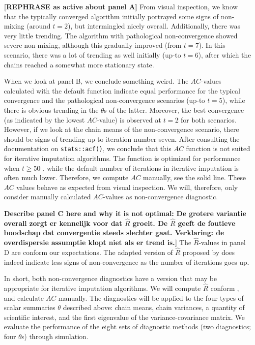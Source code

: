 \documentclass[Royal,times,sageh]{sagej}
\begin{document}
\textbf{{[}REPHRASE as active about panel A{]}} From visual inspection, we know that the typically converged algorithm initially portrayed some signs of non-mixing (around \(t=2\)), but intermingled nicely overall. Additionally, there was very little trending. The algorithm with pathological non-convergence showed severe non-mixing, although this gradually improved (from \(t=7\)). In this scenario, there was a lot of trending as well initially (up-to \(t=6\)), after which the chains reached a somewhat more stationary state.

When we look at panel B, we conclude something weird. The \(AC\)-values calculated with the default function indicate equal performance for the typical convergence and the pathological non-convergence scenarios (up-to \(t=5\)), while there is obvious trending in the \(\theta\)s of the latter. Moreover, the best convergence (as indicated by the lowest \(AC\)-value) is observed at \(t=2\) for both scenarios. However, if we look at the chain means of the non-convergence scenario, there should be signs of trending up-to iteration number seven. After consulting the documentation on \texttt{stats::acf()}, we conclude that this \(AC\) function is not suited for iterative imputation algorithms. The function is optimized for performance when \(t\geq50\) \citep{box15}, while the default number of iterations in iterative imputation is often much lower. Therefore, we compute \(AC\) manually, see the solid line. These \(AC\) values behave as expected from visual inspection. We will, therefore, only consider manually calculated \(AC\)-values as non-convergence diagnostic.

\textbf{Describe panel C here and why it is not optimal: De grotere variantie overall zorgt er kennelijk voor dat \(\widehat{R}\) groeit. De \(\widehat{R}\) geeft de foutieve boodschap dat convergentie steeds slechter gaat. Verklaring: de overdispersie assumptie klopt niet als er trend is.{]}} The \(\widehat{R}\)-values in panel D are conform our expectations. The adapted version of \(\widehat{R}\) proposed by \citet{veht19} does indeed indicate less signs of non-convergence as the number of iterations goes up. \textbf{\citep[explain the dip in Rhat values at t=2. Namely, because we can only use 2 of the 3 tricks by][ if the number of iterations is very low (t\textless4). That's why the \(\widehat{R}\)s are more similar to the traditional GR.]{veht19}} \newline

\noindent In short, both non-convergence diagnostics have a version that may be appropriate for iterative imputation algorithms. We will compute \(\widehat{R}\) conform \citet{veht19}, and calculate \(AC\) manually. The diagnostics will be applied to the four types of scalar summaries \(\theta\) described above: chain means, chain variances, a quantity of scientific interest, and the first eigenvalue of the variance-covariance matrix. We evaluate the performance of the eight sets of diagnostic methods (two diagnostics; four \(\theta\)s) through simulation.
\end{document}
